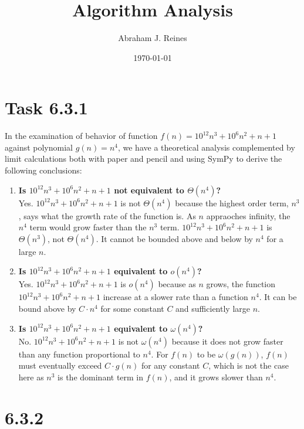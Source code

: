 \documentclass{article}
\title{Algorithm Analysis}
\author{Abraham J. Reines} %
\date{\today} %
\begin{document}
\maketitle

\section*{Task 6.3.1}

In the examination of behavior of function $f(n) = 10^{12}n^3 + 10^6n^2 + n + 1$ against polynomial $g(n) = n^4$, we have a theoretical analysis complemented by limit calculations both with paper and pencil and using SymPy to derive the following conclusions:

\begin{enumerate}
    \item \textbf{Is \( 10^{12}n^3 + 10^6n^2 + n + 1 \) not equivalent to \( \Theta(n^4) \)?}\\
    Yes. \( 10^{12}n^3 + 10^6n^2 + n + 1 \) is not \( \Theta(n^4) \) because the highest order term, \( n^3 \), says what the growth rate of the function is. As \( n \) appraoches infinity, the \( n^4 \) term would grow faster than the \( n^3 \) term. \( 10^{12}n^3 + 10^6n^2 + n + 1 \) is \( \Theta(n^3) \), not \( \Theta(n^4) \). It cannot be bounded above and below by \( n^4 \) for a large \( n \).

    \item \textbf{Is \( 10^{12}n^3 + 10^6n^2 + n + 1 \) equivalent to \( o(n^4) \)?}\\
    Yes. \( 10^{12}n^3 + 10^6n^2 + n + 1 \) is \( o(n^4) \) because as \( n \) grows, the function \( 10^{12}n^3 + 10^6n^2 + n + 1 \) increase at a slower rate than a function \( n^4 \). It can be bound above by \( C \cdot n^4 \) for some constant \( C \) and sufficiently large \( n \).

    \item \textbf{Is \( 10^{12}n^3 + 10^6n^2 + n + 1 \) equivalent to \( \omega(n^4) \)?}\\
    No. \( 10^{12}n^3 + 10^6n^2 + n + 1 \) is not \( \omega(n^4) \) because it does not grow faster than any function proportional to \( n^4 \). For \( f(n) \) to be \( \omega(g(n)) \), \( f(n) \) must eventually exceed \( C \cdot g(n) \) for any constant \( C \), which is not the case here as \( n^3 \) is the dominant term in \( f(n) \), and it grows slower than \( n^4 \).
\end{enumerate}

\section*{6.3.2}
\end{document}
